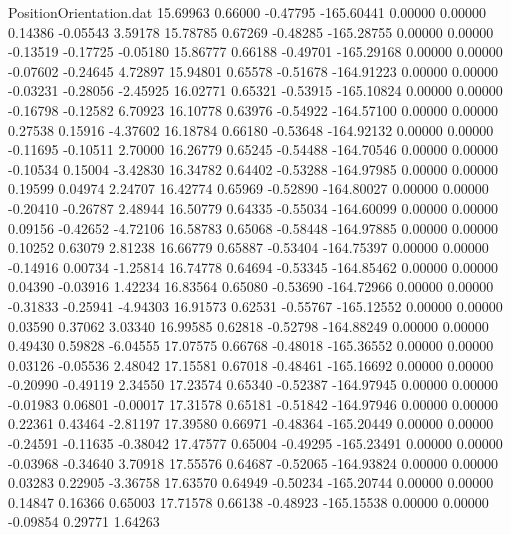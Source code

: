 \begin{filecontents}{PositionOrientation.dat}
  15.69963    0.66000   -0.47795  -165.60441    0.00000    0.00000    0.14386   -0.05543    3.59178
  15.78785    0.67269   -0.48285  -165.28755    0.00000    0.00000   -0.13519   -0.17725   -0.05180
  15.86777    0.66188   -0.49701  -165.29168    0.00000    0.00000   -0.07602   -0.24645    4.72897
  15.94801    0.65578   -0.51678  -164.91223    0.00000    0.00000   -0.03231   -0.28056   -2.45925
  16.02771    0.65321   -0.53915  -165.10824    0.00000    0.00000   -0.16798   -0.12582    6.70923
  16.10778    0.63976   -0.54922  -164.57100    0.00000    0.00000    0.27538    0.15916   -4.37602
  16.18784    0.66180   -0.53648  -164.92132    0.00000    0.00000   -0.11695   -0.10511    2.70000
  16.26779    0.65245   -0.54488  -164.70546    0.00000    0.00000   -0.10534    0.15004   -3.42830
  16.34782    0.64402   -0.53288  -164.97985    0.00000    0.00000    0.19599    0.04974    2.24707
  16.42774    0.65969   -0.52890  -164.80027    0.00000    0.00000   -0.20410   -0.26787    2.48944
  16.50779    0.64335   -0.55034  -164.60099    0.00000    0.00000    0.09156   -0.42652   -4.72106
  16.58783    0.65068   -0.58448  -164.97885    0.00000    0.00000    0.10252    0.63079    2.81238
  16.66779    0.65887   -0.53404  -164.75397    0.00000    0.00000   -0.14916    0.00734   -1.25814
  16.74778    0.64694   -0.53345  -164.85462    0.00000    0.00000    0.04390   -0.03916    1.42234
  16.83564    0.65080   -0.53690  -164.72966    0.00000    0.00000   -0.31833   -0.25941   -4.94303
  16.91573    0.62531   -0.55767  -165.12552    0.00000    0.00000    0.03590    0.37062    3.03340
  16.99585    0.62818   -0.52798  -164.88249    0.00000    0.00000    0.49430    0.59828   -6.04555
  17.07575    0.66768   -0.48018  -165.36552    0.00000    0.00000    0.03126   -0.05536    2.48042
  17.15581    0.67018   -0.48461  -165.16692    0.00000    0.00000   -0.20990   -0.49119    2.34550
  17.23574    0.65340   -0.52387  -164.97945    0.00000    0.00000   -0.01983    0.06801   -0.00017
  17.31578    0.65181   -0.51842  -164.97946    0.00000    0.00000    0.22361    0.43464   -2.81197
  17.39580    0.66971   -0.48364  -165.20449    0.00000    0.00000   -0.24591   -0.11635   -0.38042
  17.47577    0.65004   -0.49295  -165.23491    0.00000    0.00000   -0.03968   -0.34640    3.70918
  17.55576    0.64687   -0.52065  -164.93824    0.00000    0.00000    0.03283    0.22905   -3.36758
  17.63570    0.64949   -0.50234  -165.20744    0.00000    0.00000    0.14847    0.16366    0.65003
  17.71578    0.66138   -0.48923  -165.15538    0.00000    0.00000   -0.09854    0.29771    1.64263

\end{filecontents}
